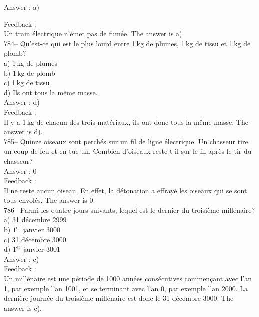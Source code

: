 ﻿\documentclass[letterpaper, 12pt]{article}
\begin{document}
Answer : a)

Feedback : \\
Un train \'electrique n'\'emet pas de fum\'ee. The answer is a).\\

784-- Qu'est-ce qui est le plus lourd entre 1\,kg de plumes, 1\,kg de tissu
et 1\,kg de plomb?\\
a) 1\,kg de plumes\\
b) 1\,kg de plomb\\
c) 1\,kg de tissu\\
d) Ils ont tous la m\^eme masse.\\

Answer : d)\\

Feedback : \\
Il y a 1\,kg de chacun des trois mat\'eriaux, ils ont donc tous la m\^eme
masse.  The answer is d).\\

785-- Quinze oiseaux sont perch\'es sur un fil de ligne \'electrique.  Un
chasseur tire un coup de feu et en tue un.  Combien d'oiseaux reste-t-il sur
le fil apr\`es le tir du chasseur?\\

Answer : 0\\

Feedback : \\
Il ne reste aucun oiseau. En effet, la d\'etonation a effray\'e les oiseaux
qui se sont tous envol\'es. The answer is 0. \\

786-- Parmi les quatre jours suivants, lequel est le dernier du troisi\`eme
mill\'enaire?\\
a) 31 d\'ecembre 2999\\
b) $1^{\textrm{er}}$ janvier 3000\\
c) 31 d\'ecembre 3000\\
d) $1^{\textrm{er}}$ janvier 3001\\

Answer : c)\\

Feedback : \\
Un mill\'enaire est une p\'eriode de 1000 ann\'ees cons\'ecutives commen\c
cant avec l'an 1, par exemple l'an 1001, et se terminant avec l'an 0, par
exemple l'an 2000.  La derni\`ere journ\'ee du troisi\`eme mill\'enaire est
donc le 31 d\'ecembre 3000.  The answer is c).\\
\end{document}
